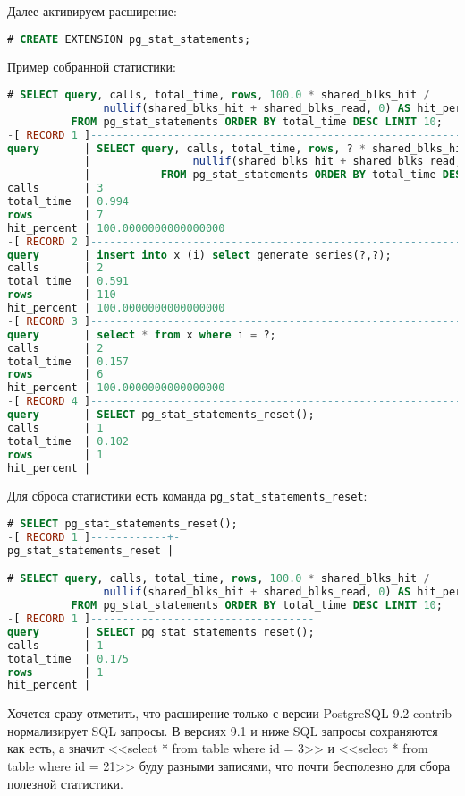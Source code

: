 Далее активируем расширение:

\begin{lstlisting}[language=SQL,label=lst:sql_performance13,caption=Активация pg\_stat\_statements]
# CREATE EXTENSION pg_stat_statements;
\end{lstlisting}

Пример собранной статистики:

\begin{lstlisting}[language=SQL,label=lst:sql_performance14,caption=pg\_stat\_statements статистика]
# SELECT query, calls, total_time, rows, 100.0 * shared_blks_hit /
               nullif(shared_blks_hit + shared_blks_read, 0) AS hit_percent
          FROM pg_stat_statements ORDER BY total_time DESC LIMIT 10;
-[ RECORD 1 ]----------------------------------------------------------------------------
query       | SELECT query, calls, total_time, rows, ? * shared_blks_hit /
            |                nullif(shared_blks_hit + shared_blks_read, ?) AS hit_percent
            |           FROM pg_stat_statements ORDER BY total_time DESC LIMIT ?;
calls       | 3
total_time  | 0.994
rows        | 7
hit_percent | 100.0000000000000000
-[ RECORD 2 ]----------------------------------------------------------------------------
query       | insert into x (i) select generate_series(?,?);
calls       | 2
total_time  | 0.591
rows        | 110
hit_percent | 100.0000000000000000
-[ RECORD 3 ]----------------------------------------------------------------------------
query       | select * from x where i = ?;
calls       | 2
total_time  | 0.157
rows        | 6
hit_percent | 100.0000000000000000
-[ RECORD 4 ]----------------------------------------------------------------------------
query       | SELECT pg_stat_statements_reset();
calls       | 1
total_time  | 0.102
rows        | 1
hit_percent |
\end{lstlisting}

Для сброса статистики есть команда \lstinline!pg_stat_statements_reset!:

\begin{lstlisting}[language=SQL,label=lst:sql_performance15,caption=Сброс статистика]
# SELECT pg_stat_statements_reset();
-[ RECORD 1 ]------------+-
pg_stat_statements_reset |

# SELECT query, calls, total_time, rows, 100.0 * shared_blks_hit /
               nullif(shared_blks_hit + shared_blks_read, 0) AS hit_percent
          FROM pg_stat_statements ORDER BY total_time DESC LIMIT 10;
-[ RECORD 1 ]-----------------------------------
query       | SELECT pg_stat_statements_reset();
calls       | 1
total_time  | 0.175
rows        | 1
hit_percent |
\end{lstlisting}

Хочется сразу отметить, что расширение только с версии PostgreSQL 9.2 contrib нормализирует SQL запросы. В версиях 9.1 и ниже SQL запросы сохраняются как есть, а значит <<select * from table where id = 3>> и <<select * from table where id = 21>> буду разными записями, что почти бесполезно для сбора полезной статистики.